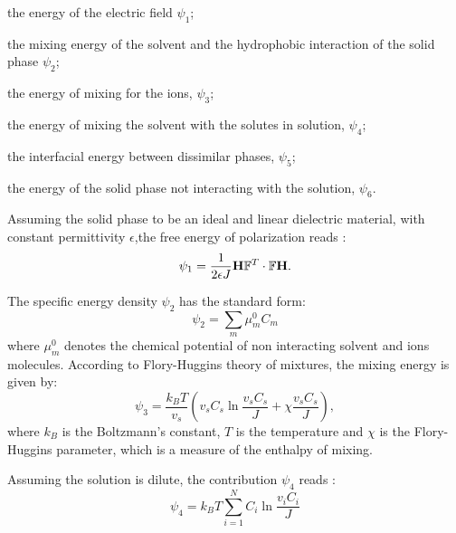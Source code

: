 \begin{enumerate}
	{\indentitem\item[\textbullet] the energy of the electric field $\psi_1$;}
	{\indentitem \item[\textbullet] the mixing energy of the solvent and the hydrophobic interaction of the solid phase $\psi_2$;}
	{\indentitem\item[\textbullet] the energy of mixing for the ions, $\psi_3$;}
	{\indentitem\item[\textbullet] the energy of mixing the solvent with the solutes in solution, $\psi_4$;}
	{\indentitem\item[\textbullet] the interfacial energy between dissimilar phases, $\psi_5$;}
	{\indentitem\item[\textbullet] the energy of the solid phase not interacting with the solution, $\psi_6$.}
\end{enumerate}

Assuming the solid phase to be an ideal and linear dielectric material, with constant permittivity $\epsilon$,the free energy of polarization reads \cite{DROZDOV+,Reviewpolyel}:
\begin{gather}
\psi_1 = \frac{1}{2\epsilon J} \mathbf{H}\mathbb{F}^T \cdot \mathbb{F} \mathbf{H}.
\end{gather}

The specific energy density $\psi_2$ has the standard form:
\begin{equation}
\psi_2 = \sum\limits_{m} \mu^0_m C_m
\end{equation} 
where $\mu^0_m$ denotes the chemical potential of non interacting solvent and ions molecules. According to Flory-Huggins theory \cite{flory,hug} of mixtures, the mixing energy is given by:
\begin{equation}
\psi_3 = \frac{k_B T }{v_s} \left(v_sC_s \ln \frac{v_sC_s}{J} + \chi \frac{v_sC_s}{J}\right),\label{mix}
\end{equation}
where $k_B$ is the Boltzmann's constant, $T$ is the temperature and $\chi$ is the Flory-Huggins parameter, which is a measure of the enthalpy of mixing. 

Assuming the solution is dilute, the contribution $\psi_4$ reads \cite{Reviewpolyel,ecm1,ecm2}:
\begin{equation}
\psi_4 = k_B T \sum\limits_{i=1}^{N}C_i \ln \frac{v_iC_i}{J}
\end{equation}


